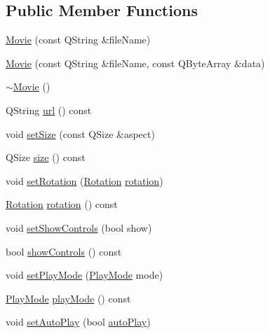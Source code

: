\subsection*{Public Member Functions}
\begin{DoxyCompactItemize}
\item 
\hyperlink{classOkular_1_1Movie_a3a8c358194f191347327db9fbb1f4aa3}{Movie} (const Q\+String \&file\+Name)
\item 
\hyperlink{classOkular_1_1Movie_a0f11da93dc5f735fe7c88842c40a6c7a}{Movie} (const Q\+String \&file\+Name, const Q\+Byte\+Array \&data)
\item 
\hyperlink{classOkular_1_1Movie_abf1d82f3db5306141635e34cdb80273c}{$\sim$\+Movie} ()
\item 
Q\+String \hyperlink{classOkular_1_1Movie_af04e278dbed1c47b567fa7adc2a9d035}{url} () const 
\item 
void \hyperlink{classOkular_1_1Movie_aaa87050fba266ea14b37b7c9fa458c2f}{set\+Size} (const Q\+Size \&aspect)
\item 
Q\+Size \hyperlink{classOkular_1_1Movie_a9dad9cd8643d12b8794547470df05e81}{size} () const 
\item 
void \hyperlink{classOkular_1_1Movie_a4757f9f66bdf2e55e3a5152f7e64feff}{set\+Rotation} (\hyperlink{namespaceOkular_a8556d00465f61ef533c6b027669e7da6}{Rotation} \hyperlink{classOkular_1_1Movie_a641d9edc033d2308a7982f074bc01de1}{rotation})
\item 
\hyperlink{namespaceOkular_a8556d00465f61ef533c6b027669e7da6}{Rotation} \hyperlink{classOkular_1_1Movie_a641d9edc033d2308a7982f074bc01de1}{rotation} () const 
\item 
void \hyperlink{classOkular_1_1Movie_a72c045992d6fb31a7280e069422e43e5}{set\+Show\+Controls} (bool show)
\item 
bool \hyperlink{classOkular_1_1Movie_a2b609559fc76b4ccf4aa647db9528be0}{show\+Controls} () const 
\item 
void \hyperlink{classOkular_1_1Movie_aded1be790e1fa157dbc9b735e05429e7}{set\+Play\+Mode} (\hyperlink{classOkular_1_1Movie_ac15c187b1f32107f51813a0da17e099b}{Play\+Mode} mode)
\item 
\hyperlink{classOkular_1_1Movie_ac15c187b1f32107f51813a0da17e099b}{Play\+Mode} \hyperlink{classOkular_1_1Movie_a55f41a08014fa825ff6afc97d2461e39}{play\+Mode} () const 
\item 
void \hyperlink{classOkular_1_1Movie_a732120bf461a2c6d8682732f0fbcc780}{set\+Auto\+Play} (bool \hyperlink{classOkular_1_1Movie_afee77daf9321afaf6c164a464d516940}{auto\+Play})

\end{DoxyCompactItemize}
